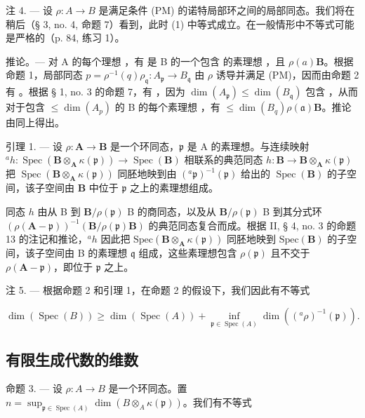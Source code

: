 注 4. --- 设 \(\rho: A \to B\) 是满足条件 (PM) 的诺特局部环之间的局部同态。我们将在稍后（§ 3, no. 4, 命题 7）看到，此时 (1) 中等式成立。在一般情形中不等式可能是严格的（p. 84, 练习 1）。

推论。--- 对 A 的每个理想  ，有
是 B 的一个包含  的素理想
，且 \(\rho(a)\mathbf{B}\)。根据命题 1，局部同态 \(p = \rho^{-1}(q)\)\(\rho_{\mathfrak{q}}: A_{\mathfrak{p}} \to B_{\mathfrak{q}}\) 由 \(\rho\) 诱导并满足 (PM)，因而由命题 2 有  。根据 § 1, no. 3 的命题 7，有  ，因为 \(\dim(A_{\mathfrak{p}}) \leqslant \dim(B_{\mathfrak{q}})\) 包含  ，从而对于包含 \(\leqslant \dim(A_p)\) 的 B 的每个素理想  ，有 \(\leqslant \dim(B_q)\)\(\rho(\mathfrak{a})\mathbf{B}\)。推论由同上得出。

引理 1. — 设 \(\rho: \mathbf{A} \to \mathbf{B}\) 是一个环同态，\(\mathfrak{p}\) 是 A 的素理想。与连续映射 \(^{a}h: \operatorname{Spec}(\mathbf{B} \otimes_{\mathbf{A}} \kappa(\mathfrak{p})) \to \operatorname{Spec}(\mathbf{B})\) 相联系的典范同态 \(h:\mathbf{B}\to\mathbf{B}\otimes_{\mathbf{A}}\kappa(\mathfrak{p})\) 把 \(\operatorname{Spec}(\mathbf{B}\otimes_{\mathbf{A}}\kappa(\mathfrak{p}))\) 同胚地映到由 \((^{a}\mathfrak{p})^{-1}(\mathfrak{p})\) 给出的 \(\operatorname{Spec}(\mathbf{B})\) 的子空间，该子空间由 \(\mathbf{B}\) 中位于 \(\mathfrak{p}\) 之上的素理想组成。

同态 \(h\) 由从 B 到 \(\mathbf{B} / \rho(\mathfrak{p})\) B 的商同态，以及从 \(\mathbf{B} / \rho(\mathfrak{p})\) B 到其分式环 \((\rho(\mathbf{A} - \mathfrak{p}))^{-1}(\mathbf{B} / \rho(\mathfrak{p}) \mathbf{B})\) 的典范同态复合而成。根据 II, § 4, no. 3 的命题 13 的注记和推论，\(^a h\) 因此把 \(\text{Spec}(\mathbf{B} \otimes_{\mathbf{A}} \kappa(\mathfrak{p}))\) 同胚地映到 \(\text{Spec}(\mathbf{B})\) 的子空间，该子空间由 B 的素理想 \(\mathfrak{q}\) 组成，这些素理想包含 \(\rho(\mathfrak{p})\) 且不交于 \(\rho(\mathbf{A} - \mathfrak{p})\)，即位于 \(\mathfrak{p}\) 之上。

注 5. --- 根据命题 2 和引理 1，在命题 2 的假设下，我们因此有不等式

\[
\dim (\operatorname{Spec} (B)) \geqslant \dim (\operatorname{Spec} (A)) + \inf _ {\mathfrak {p} \in \operatorname{Spec} (A)} \dim \left(({}^{a}\rho)^{-1} (\mathfrak {p})\right).\tag{4}
\]

\subsection{有限生成代数的维数}

命题 3. --- 设 \(\rho: A \to B\) 是一个环同态。置 \(n = \sup_{\mathfrak{p} \in \operatorname{Spec}(A)} \dim(B \otimes_A \kappa(\mathfrak{p}))\)。我们有不等式

